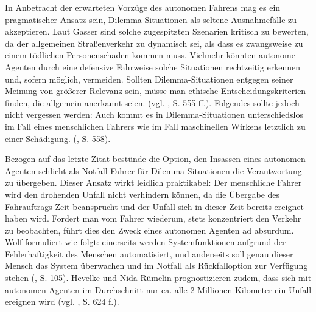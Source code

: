\documentclass[a4paper, 12pt, titlepage]{scrartcl}
\begin{document}
	In Anbetracht der erwarteten Vorz\"uge des autonomen Fahrens mag es ein pragmatischer Ansatz sein, Dilemma-Situationen als seltene Ausnahmef\"alle zu akzeptieren. Laut Gasser \autocite{Gasser2015} sind solche zugespitzten Szenarien kritisch zu bewerten, da der allgemeinen Stra\ss enverkehr zu dynamisch sei, als dass es zwangsweise zu einem t\"odlichen Personenschaden kommen muss. Vielmehr k\"onnten autonome Agenten durch eine defensive Fahrweise solche Situationen rechtzeitig erkennen und, sofern m\"oglich, vermeiden. Sollten Dilemma-Situationen entgegen seiner Meinung von gr\"o\ss erer Relevanz sein, m\"usse man ethische Entscheidungskriterien finden, die allgemein anerkannt seien. (vgl. \autocite{Gasser2015}, S. 555 ff.). Folgendes sollte jedoch nicht vergessen werden: \glqq Auch kommt es in \glq Dilemma-Situationen\grq{} unterschiedslos im Fall eines menschlichen Fahrers wie im Fall maschinellen Wirkens letztlich zu einer Schädigung.\grqq{} (\autocite{Gasser2015}, S. 558).
	
	Bezogen auf das letzte Zitat best\"unde die Option, den Insassen eines autonomen Agenten schlicht als \glqq Notfall-Fahrer\grqq{} f\"ur Dilemma-Situationen die Verantwortung zu \"ubergeben. Dieser Ansatz wirkt leidlich praktikabel: Der menschliche Fahrer wird den drohenden Unfall nicht verhindern k\"onnen, da die \"Ubergabe des Fahrauftrags Zeit beansprucht und der Unfall sich in dieser Zeit bereits ereignet haben wird. Fordert man vom Fahrer wiederum, stets konzentriert den Verkehr zu beobachten, f\"uhrt dies den Zweck eines autonomen Agenten ad absurdum. Wolf \autocite{Wolf2015} formuliert wie folgt: \glqq einerseits werden Systemfunktionen aufgrund der Fehlerhaftigkeit des Menschen automatisiert, und anderseits soll genau dieser Mensch das System überwachen und im Notfall als Rückfalloption zur Verfügung stehen\grqq{} (\autocite{Wolf2015}, S. 105). Hevelke und Nida-R{\"u}melin \autocite{Hevelke2015} prognostizieren zudem, dass sich mit autonomen Agenten im Durchschnitt nur ca. alle 2 Millionen Kilometer ein Unfall ereignen wird (vgl. \autocite{Hevelke2015}, S. 624 f.). 
	
\end{document}

